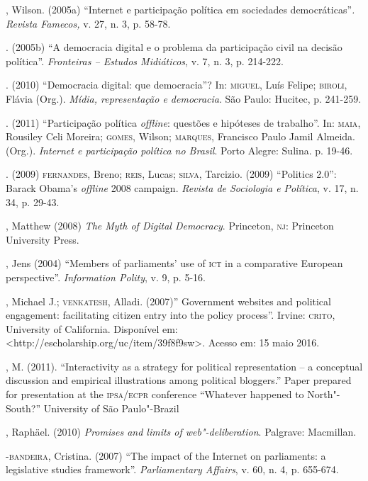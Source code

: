 \begin{bibliohedra}
, Wilson. (2005a) ``Internet e participação política em sociedades
democráticas''\emph{. Revista Famecos,} v. 27, n. 3, p. 58-78.

\titidem. (2005b) ``A democracia digital e o problema da
participação civil na decisão política''. \emph{Fronteiras -- Estudos
Midiáticos}, v. 7, n. 3, p. 214-222.

\titidem. (2010) ``Democracia digital: que democracia''? In:
\textsc{miguel}, Luís Felipe; \textsc{biroli}, Flávia (Org.). \emph{Mídia, representação e
democracia}. São Paulo: Hucitec, p. 241-259.

\titidem. (2011) ``Participação política \emph{offline}: questões e
hipóteses de trabalho''. In: \textsc{maia}, Rousiley Celi Moreira; \textsc{gomes}, Wilson;
\textsc{marques}, Francisco Paulo Jamil Almeida. (Org.). \emph{Internet e
participação política no Brasil}. Porto Alegre: Sulina. p. 19-46.

\titidem. (2009) \textsc{fernandes}, Breno; \textsc{reis}, Lucas; \textsc{silva}, Tarcizio.
(2009) ``Politics 2.0'': Barack Obama's \emph{offline} 2008 campaign.
\emph{Revista de Sociologia e Política}, v. 17, n. 34, p. 29-43.

, Matthew (2008) \emph{The Myth of Digital Democracy}. Princeton,
\textsc{nj}: Princeton University Press.

, Jens (2004) ``Members of parliaments' use of \textsc{ict} in a comparative
European perspective''. \emph{Information Polity}, v. 9, p. 5-16.

, Michael J.; \textsc{venkatesh}, Alladi. (2007)'' Government websites and
political engagement: facilitating citizen entry into the policy
process''. Irvine: \textsc{crito}, University of California. Disponível em:
\textless{}http://escholarship.org/uc/item/39f8f9sw\textgreater{}.
Acesso em: 15 maio 2016.

, M. (2011). ``Interactivity as a strategy for political
representation -- a conceptual discussion and empirical illustrations
among political bloggers.'' Paper prepared for presentation at the
\textsc{ipsa}/\textsc{ecpr} conference ``Whatever happened to North"-South?'' University of
São Paulo"-Brazil

, Raphäel. (2010) \emph{Promises and limits of web"-deliberation}.
Palgrave: Macmillan.

-\textsc{bandeira}, Cristina. (2007) ``The impact of the Internet on
parliaments: a legislative studies framework''. \emph{Parliamentary
Affairs}, v. 60, n. 4, p. 655-674.


\end{bibliohedra}
